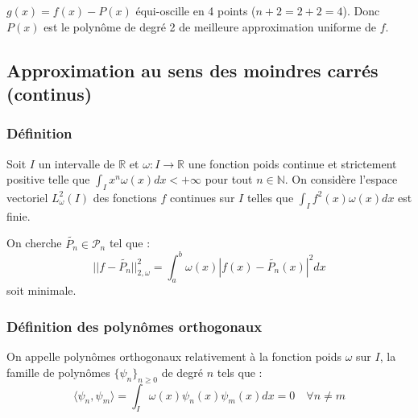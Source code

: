 $g(x)=f(x)-P(x)$ équi-oscille en 4 points ($n+2 = 2+2 = 4$). Donc $P(x)$ est le polynôme de degré 2 de meilleure approximation uniforme de $f$.

\subsection{Approximation au sens des moindres carrés (continus)}
\subsubsection*{Définition}
Soit $I$ un intervalle de $\mathbb{R}$ et $\omega:I\longrightarrow \mathbb{R}$ une fonction poids continue et strictement positive telle que $\displaystyle\int_I x^n\omega(x)dx < +\infty$ pour tout $n\in \mathbb{N}$. On considère l'espace vectoriel $L^2_\omega(I)$ des fonctions $f$ continues sur $I$ telles que $\displaystyle\int_I f^2(x)\omega(x)dx$ est finie.

On cherche $\tilde{P_n} \in \mathcal{P}_n$ tel que :
$$||f-\tilde{P_n}||_{2,\omega}^{2}=\displaystyle\int_{a}^{b}\omega(x)|f(x)-\tilde{P_n}(x)|^2dx$$
soit minimale.

\subsubsection*{Définition des polynômes orthogonaux}
On appelle polynômes orthogonaux relativement à la fonction poids $\omega$ sur $I$, la famille de polynômes $\{\psi_n\}_{n \geq 0}$ de degré $n$ tels que :
$$\langle\psi_n,\psi_m\rangle=\displaystyle\int_I\omega(x)\psi_n(x)\psi_m(x)dx=0 \quad \forall n\neq m$$

